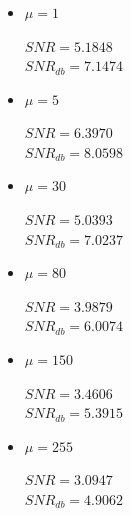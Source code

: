 \documentclass[a4paper]{article}
\begin{document}
\subsubsection{}
\begin{itemize}
	\item 
	$\mu = 1$
	\begin{flushleft}
		$SNR = 5.1848$\\
		$SNR_{db} = 7.1474$
	\end{flushleft}
	\item 
	$\mu = 5$
	\begin{flushleft}
		$SNR = 6.3970$\\
		$SNR_{db} = 8.0598$
	\end{flushleft}
	\item 
	$\mu = 30$
	\begin{flushleft}
		$SNR = 5.0393$\\
		$SNR_{db} = 7.0237$
	\end{flushleft}
	\item 
	$\mu = 80$
	\begin{flushleft}
		$SNR = 3.9879$\\
		$SNR_{db} = 6.0074$
	\end{flushleft}
	\item 
	$\mu = 150$
	\begin{flushleft}
		$SNR = 3.4606$\\
		$SNR_{db} = 5.3915 $
	\end{flushleft}
	\item 
	$\mu = 255$
	\begin{flushleft}
		$SNR = 3.0947$\\
		$SNR_{db} = 4.9062 $
	\end{flushleft}
\end{itemize}
\end{document}

